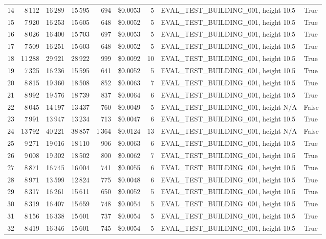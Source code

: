 \documentclass[a4paper,11pt]{article}
\begin{document}
\begin{table}[ht]
\begin{tabular}{r r r r r r r p{3cm} l}
14 & 8\,112 & 16\,289 & 15\,595 & 694 & \$0.0053 & 5 & EVAL\_TEST\_BUILDING\_001, height 10.5 & True \\
15 & 7\,920 & 16\,253 & 15\,605 & 648 & \$0.0052 & 5 & EVAL\_TEST\_BUILDING\_001, height 10.5 & True \\
16 & 8\,026 & 16\,400 & 15\,703 & 697 & \$0.0053 & 5 & EVAL\_TEST\_BUILDING\_001, height 10.5 & True \\
17 & 7\,509 & 16\,251 & 15\,603 & 648 & \$0.0052 & 5 & EVAL\_TEST\_BUILDING\_001, height 10.5 & True \\
18 & 11\,288 & 29\,921 & 28\,922 & 999 & \$0.0092 & 10 & EVAL\_TEST\_BUILDING\_001, height 10.5 & True \\
19 & 7\,325 & 16\,236 & 15\,595 & 641 & \$0.0052 & 5 & EVAL\_TEST\_BUILDING\_001, height 10.5 & True \\
20 & 8\,815 & 19\,360 & 18\,508 & 852 & \$0.0063 & 7 & EVAL\_TEST\_BUILDING\_001, height 10.5 & True \\
21 & 8\,992 & 19\,576 & 18\,739 & 837 & \$0.0064 & 6 & EVAL\_TEST\_BUILDING\_001, height 10.5 & True \\
22 & 8\,045 & 14\,197 & 13\,437 & 760 & \$0.0049 & 5 & EVAL\_TEST\_BUILDING\_001, height N/A & False \\
23 & 7\,991 & 13\,947 & 13\,234 & 713 & \$0.0047 & 6 & EVAL\_TEST\_BUILDING\_001, height 10.5 & True \\
24 & 13\,792 & 40\,221 & 38\,857 & 1\,364 & \$0.0124 & 13 & EVAL\_TEST\_BUILDING\_001, height N/A & False \\
25 & 9\,271 & 19\,016 & 18\,110 & 906 & \$0.0063 & 6 & EVAL\_TEST\_BUILDING\_001, height 10.5 & True \\
26 & 9\,008 & 19\,302 & 18\,502 & 800 & \$0.0062 & 7 & EVAL\_TEST\_BUILDING\_001, height 10.5 & True \\
27 & 8\,871 & 16\,745 & 16\,004 & 741 & \$0.0055 & 6 & EVAL\_TEST\_BUILDING\_001, height 10.5 & True \\
28 & 8\,971 & 13\,599 & 12\,824 & 775 & \$0.0048 & 6 & EVAL\_TEST\_BUILDING\_001, height 10.5 & True \\
29 & 8\,317 & 16\,261 & 15\,611 & 650 & \$0.0052 & 5 & EVAL\_TEST\_BUILDING\_001, height 10.5 & True \\
30 & 8\,319 & 16\,407 & 15\,659 & 748 & \$0.0054 & 5 & EVAL\_TEST\_BUILDING\_001, height 10.5 & True \\
31 & 8\,156 & 16\,338 & 15\,601 & 737 & \$0.0054 & 5 & EVAL\_TEST\_BUILDING\_001, height 10.5 & True \\
32 & 8\,419 & 16\,346 & 15\,601 & 745 & \$0.0054 & 5 & EVAL\_TEST\_BUILDING\_001, height 10.5 & True \\

\end{tabular}
\end{table}
\end{document}
